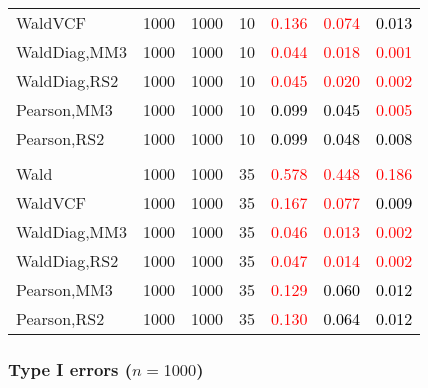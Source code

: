\documentclass[
]{article}
\begin{document}
\begin{table}[H]
{\begin{tabular}[t]{lrrrrrr}
\hspace{1em}WaldVCF & 1000 & 1000 & 10 & \textcolor{red}{0.136} & \textcolor{red}{0.074} & \textcolor{black}{0.013}\\
\hspace{1em}WaldDiag,MM3 & 1000 & 1000 & 10 & \textcolor{red}{0.044} & \textcolor{red}{0.018} & \textcolor{red}{0.001}\\
\hspace{1em}WaldDiag,RS2 & 1000 & 1000 & 10 & \textcolor{red}{0.045} & \textcolor{red}{0.020} & \textcolor{red}{0.002}\\
\hspace{1em}Pearson,MM3 & 1000 & 1000 & 10 & \textcolor{black}{0.099} & \textcolor{black}{0.045} & \textcolor{red}{0.005}\\
\hspace{1em}Pearson,RS2 & 1000 & 1000 & 10 & \textcolor{black}{0.099} & \textcolor{black}{0.048} & \textcolor{black}{0.008}\\
\addlinespace[0.3em]
\multicolumn{7}{l}{\textbf{3F 15V}}\\
\hspace{1em}Wald & 1000 & 1000 & 35 & \textcolor{red}{0.578} & \textcolor{red}{0.448} & \textcolor{red}{0.186}\\
\hspace{1em}WaldVCF & 1000 & 1000 & 35 & \textcolor{red}{0.167} & \textcolor{red}{0.077} & \textcolor{black}{0.009}\\
\hspace{1em}WaldDiag,MM3 & 1000 & 1000 & 35 & \textcolor{red}{0.046} & \textcolor{red}{0.013} & \textcolor{red}{0.002}\\
\hspace{1em}WaldDiag,RS2 & 1000 & 1000 & 35 & \textcolor{red}{0.047} & \textcolor{red}{0.014} & \textcolor{red}{0.002}\\
\hspace{1em}Pearson,MM3 & 1000 & 1000 & 35 & \textcolor{red}{0.129} & \textcolor{black}{0.060} & \textcolor{black}{0.012}\\
\hspace{1em}Pearson,RS2 & 1000 & 1000 & 35 & \textcolor{red}{0.130} & \textcolor{black}{0.064} & \textcolor{black}{0.012}\\
\bottomrule
\end{tabular}}
\endgroup{}
\end{table}

\hypertarget{type-i-errors-n1000-3}{%
\subsubsection{\texorpdfstring{Type I errors
(\(n=1000\))}{Type I errors (n=1000)}}\label{type-i-errors-n1000-3}}
\end{document}
